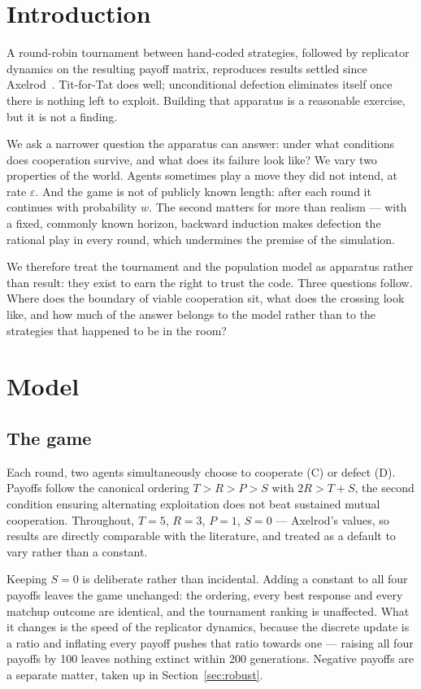 \documentclass[11pt,a4paper]{article}
\newcommand{\eps}{\varepsilon}
\begin{document}
\section{Introduction}
\label{sec:intro}

A round-robin tournament between hand-coded strategies, followed by replicator
dynamics on the resulting payoff matrix, reproduces results settled since
Axelrod~\cite{axelrod1984,axelrod1981}. Tit-for-Tat does well; unconditional
defection eliminates itself once there is nothing left to exploit. Building that
apparatus is a reasonable exercise, but it is not a finding.

We ask a narrower question the apparatus can answer: under what conditions
does cooperation survive, and what does its failure look like? We vary two
properties of the world. Agents sometimes play a move they did not intend, at
rate $\eps$. And the game is not of publicly known length: after each round it
continues with probability $w$. The second matters for more than
realism --- with a fixed, commonly known horizon, backward induction makes
defection the rational play in every round, which undermines the premise of the
simulation.

We therefore treat the tournament and the population model as apparatus rather
than result: they exist to earn the right to trust the code. Three questions
follow. Where does the boundary of viable cooperation sit, what does the crossing
look like, and how much of the answer belongs to the model rather than to the
strategies that happened to be in the room?

\section{Model}
\label{sec:model}

\subsection{The game}
\label{sec:game}

Each round, two agents simultaneously choose to cooperate (\textsf{C}) or defect
(\textsf{D}). Payoffs follow the canonical ordering $T > R > P > S$ with
$2R > T + S$, the second condition ensuring alternating exploitation does not
beat sustained mutual cooperation. Throughout, $T=5$, $R=3$, $P=1$, $S=0$ ---
Axelrod's values, so results are directly comparable with the literature, and
treated as a default to vary rather than a constant.

Keeping $S = 0$ is deliberate rather than incidental. Adding a constant to all
four payoffs leaves the game unchanged: the ordering, every best response and
every matchup outcome are identical, and the tournament ranking is unaffected.
What it changes is the speed of the replicator dynamics, because the discrete
update is a ratio and inflating every payoff pushes that ratio towards one ---
raising all four payoffs by 100 leaves nothing extinct within 200 generations.
Negative payoffs are a separate matter, taken up in
Section~\ref{sec:robust}.
\end{document}
